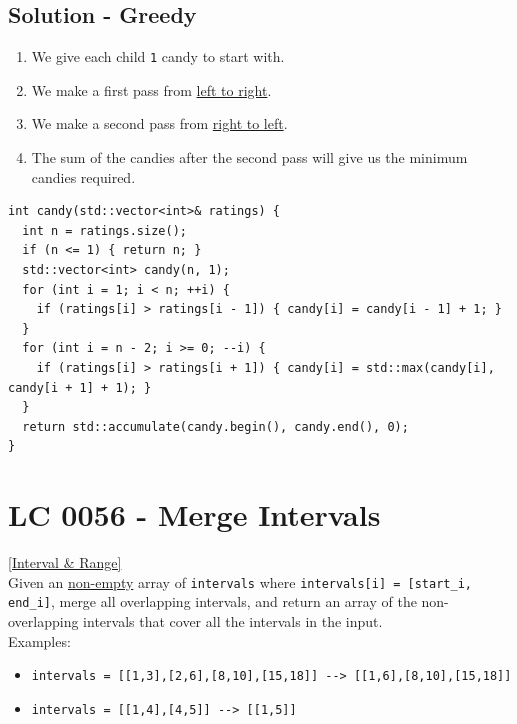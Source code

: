 \subsection*{Solution - Greedy}
\begin{enumerate}
\item We give each child {\colorbox{CodeBackground}{\lstinline|1|}} candy to start with.
\item We make a first pass from \ul{left to right}. {\color{magenta}{For each child (except the first one), if their rating is higher than the previous child, we give them one more candy than the previous child.}}
\item We make a second pass from \ul{right to left}. {\color{magenta}{For each child (except the last one), if their rating is higher than the next child, we check if the current candy count satisfies the condition. If not, we update the count to be one more than the next child's count.}}
\item The sum of the candies after the second pass will give us the minimum candies required.
\end{enumerate}
\begin{lstlisting}
int candy(std::vector<int>& ratings) {
  int n = ratings.size();
  if (n <= 1) { return n; }
  std::vector<int> candy(n, 1);
  for (int i = 1; i < n; ++i) {
    if (ratings[i] > ratings[i - 1]) { candy[i] = candy[i - 1] + 1; }
  }
  for (int i = n - 2; i >= 0; --i) {
    if (ratings[i] > ratings[i + 1]) { candy[i] = std::max(candy[i], candy[i + 1] + 1); }
  }
  return std::accumulate(candy.begin(), candy.end(), 0);
}
\end{lstlisting}

\section{LC 0056 - Merge Intervals}\label{lc0056}
\hyperref[sec:interval_range]{[Interval \& Range]}\\

Given an \ul{non-empty} array of {\colorbox{CodeBackground}{\lstinline|intervals|}} where {\colorbox{CodeBackground}{\lstinline|intervals[i] = [start_i, end_i]|}}, merge all overlapping intervals, and return an array of the non-overlapping intervals that cover all the intervals in the input.\\

Examples:
\begin{itemize}
	\item {\colorbox{CodeBackground}{\lstinline|intervals = [[1,3],[2,6],[8,10],[15,18]] --> [[1,6],[8,10],[15,18]]|}}
	\item {\colorbox{CodeBackground}{\lstinline|intervals = [[1,4],[4,5]] --> [[1,5]]|}}
\end{itemize}

